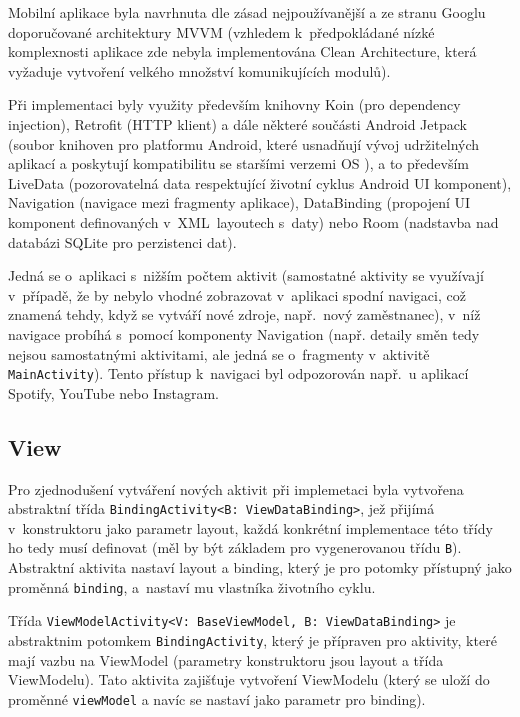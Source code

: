 \documentclass[twoside]{ctuthesis}
\begin{document}
Mobilní aplikace byla navrhnuta dle zásad nejpoužívanější a ze stranu Googlu doporučované architektury MVVM (vzhledem k~před\-po\-klá\-da\-né nízké komplexnosti aplikace zde nebyla implementována Clean Architecture, která vyžaduje vytvoření velkého množství komunikujících modulů).

Při implementaci byly využity především knihovny Koin (pro dependency injection), Retrofit (HTTP klient) a dále některé součásti Android Jetpack (soubor knihoven pro platformu Android, které usnadňují vývoj udržitelných aplikací a poskytují kompatibilitu se staršími verzemi OS \cite{android2020jetpack}), a to především LiveData (pozorovatelná data respektující životní cyklus Android UI komponent), Navigation (navigace mezi fragmenty aplikace), DataBinding (propojení UI komponent definovaných v~XML~layoutech s~daty) nebo Room (nadstavba nad databázi SQLite pro perzistenci dat).

Jedná se o~aplikaci s~nižším počtem aktivit (samostatné aktivity se využívají v~případě, že by nebylo vhodné zobrazovat v~aplikaci spodní navigaci, což znamená tehdy, když se vytváří nové zdroje, např.~nový zaměstnanec), v~níž navigace probíhá s~pomocí komponenty Navigation (např. detaily směn tedy nejsou sa\-mos\-tat\-ný\-mi aktivitami, ale jedná se o~fragmenty v~aktivitě \texttt{MainActivity}). Tento přístup k~navigaci byl odpozorován např.~u aplikací Spotify, YouTube nebo Instagram.

\subsection{View}

Pro zjednodušení vytváření nových aktivit při implemetaci byla vytvořena abstraktní třída \texttt{BindingActivity<B: ViewDataBinding>}, jež přijímá v~kon\-struk\-to\-ru jako parametr layout, každá konkrétní implementace této třídy ho tedy musí definovat (měl by být základem pro vygenerovanou třídu \texttt{B}). Abstraktní aktivita nastaví layout a binding, který je pro potomky přístupný jako proměnná \texttt{binding}, a~nastaví mu vlastníka životního cyklu.

Třída \texttt{ViewModelActivity<V: BaseViewModel, B:  ViewDataBinding>} je abstraktnim potomkem \texttt{BindingActivity}, který je přípraven pro aktivity, které mají vazbu na ViewModel (parametry konstruktoru jsou layout a třída ViewModelu). Tato aktivita zajišťuje vytvoření ViewModelu (který se uloží do proměnné \texttt{viewModel} a navíc se nastaví jako parametr pro binding).
\end{document}
